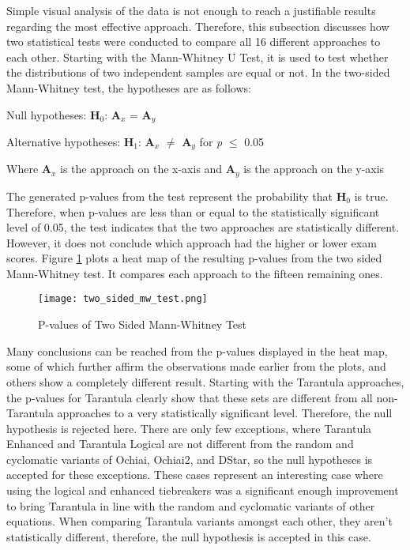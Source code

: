Simple visual analysis of the data is not enough to reach a justifiable results
regarding the most effective approach. Therefore, this subsection discusses how
two statistical tests were conducted to compare all 16 different approaches to
each other. Starting with the Mann-Whitney U Test, it is used to test whether
the distributions of two independent samples are equal or not. In the two-sided
Mann-Whitney test, the hypotheses are as follows:
\begin{center}
    Null hypotheses: \textbf{H$_{0}$}: \textbf{A$_{x}$} = \textbf{A$_{y}$}

    Alternative hypotheses: \textbf{H$_{1}$}: \textbf{A$_{x}$} $\neq$
    \textbf{A$_{y}$}
    for \emph{p} $\leq$  0.05

    Where \textbf{A$_{x}$} is the approach on the x-axis and \textbf{A$_{y}$} is
    the approach on the y-axis
\end{center}

The generated p-values from the test represent the probability that
\textbf{H$_{0}$} is true. Therefore, when p-values are less than or equal to the statistically
significant level of 0.05, the test indicates that the two approaches are
statistically different. However, it does not conclude which approach had the
higher or lower exam scores. Figure \ref{fig:two_sided_mw_test} plots a heat map
of the resulting p-values from the two sided Mann-Whitney test. It compares each
approach to the fifteen remaining ones.

\begin{figure}[!htb]
	\begin{center}
		\texttt{[image: two\_sided\_mw\_test.png]}
        \caption{\label{fig:two_sided_mw_test} P-values of Two Sided Mann-Whitney Test}
	\end{center}
\end{figure}

Many conclusions can be reached from the p-values displayed in the heat map,
some of which further affirm the observations made earlier from the plots, and
others show a completely different result. Starting with the Tarantula
approaches, the p-values for Tarantula clearly
show that these sets are different from all non-Tarantula approaches to a very
statistically significant level.
Therefore, the null hypothesis is rejected
here. There are only few exceptions, where Tarantula Enhanced and Tarantula
Logical are not different from the random and cyclomatic variants of Ochiai,
Ochiai2, and DStar, so the null hypotheses is accepted for these exceptions.
These cases represent an interesting case where using the logical and enhanced
tiebreakers was a significant enough improvement to bring Tarantula in line with
the random and cyclomatic variants of other equations.
When comparing Tarantula variants amongst each other, they aren't statistically
different, therefore, the null hypothesis is
accepted in this case.

